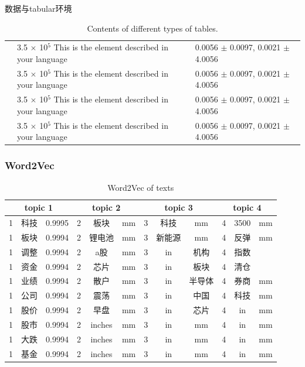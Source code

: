 \documentclass[UTF8, aspectratio=169 , 10pt，punct=kaiming]{beamer} %
\begin{document}
\begin{frame}{数据与tabular环境}
\begin{table}[H]
{\begin{tabular}{@{\extracolsep{\fill}}*{3}{l}}
      & 3.5 $\times$ 10$^{5}$ This is the element described in your language&  0.0056 $\pm$ 0.0097, 0.0021 $\pm$ 4.0056\\
      & 3.5 $\times$ 10$^{5}$ This is the element described in your language&  0.0056 $\pm$ 0.0097, 0.0021 $\pm$ 4.0056 \\
      & 3.5 $\times$ 10$^{5}$ This is the element described in your language&  0.0056 $\pm$ 0.0097, 0.0021 $\pm$ 4.0056 \\
      & 3.5 $\times$ 10$^{5}$ This is the element described in your language&  0.0056 $\pm$ 0.0097, 0.0021 $\pm$ 4.0056 \\
  \bottomrule
    \end{tabular}
    }
    \caption{Contents of different types of tables.}
  \end{table}  
  \end{frame}

\begin{frame}
  \frametitle{Word2Vec}
  \begin{table}[h]
    \scriptsize
    \setlength{\tabcolsep}{5pt}
    \centering
    \begin{tabular}{|c|c|c|c|c|c|c|c|c|c|c|c|}
      \hline
        \multicolumn{3}{|c|}{topic 1}
      & \multicolumn{3}{c|}{topic 2}
      & \multicolumn{3}{c|}{topic 3}
      & \multicolumn{3}{c|}{topic 4}\\  \hline
     1 & 科技 & 0.9995 & 2 & 板块 & mm    &3&  科技  & mm   & 4 & 3500 & mm \\   
     1 & 板块 & 0.9994 & 2 & 锂电池 & mm  &3&  新能源 & mm  & 4 & 反弹 & mm \\ 
     1 & 调整 & 0.9994 & 2 & a股 & mm     &3&  in & 机构    & 4 & 指数 &  \\  
     1 & 资金 & 0.9994 & 2 & 芯片 & mm    &3&  in & 板块    & 4 & 清仓 &  \\  
     1 & 业绩 & 0.9994 & 2 & 散户 & mm    &3&  in & 半导体   & 4 & 券商 & mm \\  
     1 & 公司 & 0.9994 & 2 & 震荡 & mm    &3&  in & 中国    & 4 & 科技 & mm \\   
     1 & 股价 & 0.9994 & 2 & 早盘& mm     &3&  in & 芯片    & 4 & in & mm \\  
     1 & 股市 & 0.9994 & 2 & inches& mm   &3&  in & mm      & 4 & in & mm \\  
     1 & 大跌 & 0.9994 & 2 & inches& mm   &3&  in & mm      & 4 & in & mm \\  
     1 & 基金 & 0.9994 & 2 & inches& mm   &3&  in & mm      & 4 & in & mm \\ \hline 
    \end{tabular}
    \caption{Word2Vec of texts}
    \label{tab:Margin_settings}
  \end{table}
\end{frame}
\end{document}
